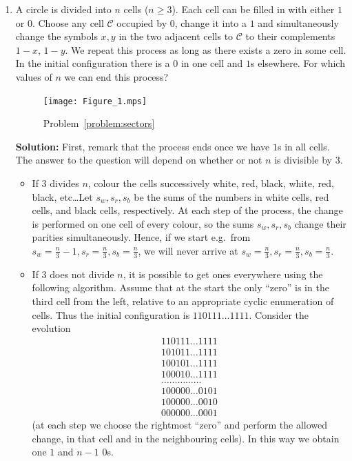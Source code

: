 \documentclass{article}
\newcommand{\solution}[1]{%
\ifsolutions%
    \textbf{Solution: } #1
\fi
}
\begin{document}
\begin{enumerate}
\item\label{problem:sectors} A circle is divided into $n$ cells ($n \geq 3$). Each cell can be filled in with either $1$ or $0$. Choose any cell $\mathcal{C}$ occupied by $0$, change it into a $1$ and simultaneously change the symbols $x, y$ in the two adjacent cells to $\mathcal{C}$ to their complements $1 - x$, $1 - y$. We repeat this process as long as there exists a zero in some cell. In the initial configuration there is a $0$ in one cell and $1$s elsewhere. For which values of $n$ we can end this process?

\begin{figure}[!ht]
\centering
\texttt{[image: Figure\_1.mps]}
\caption{Problem~\ref{problem:sectors}}
\end{figure}


\solution{%
First, remark that the process ends once we have $1$s in all cells. The answer to the question will depend on whether or not $n$ is divisible by $3$.

\begin{itemize}

\item If $3$ divides $n$, colour the cells successively white, red, black, white, red, black, etc\ldots Let $s_w, s_r, s_b$ be the sums of the numbers in white cells, red cells, and black cells, respectively. At each step of the process, the change is performed on one cell of every colour, so the sums $s_w, s_r, s_b$ change their parities simultaneously. Hence, if we start e.g.\ from $s_w = \frac{n}{3} - 1, s_r = \frac{n}{3}, s_b = \frac{n}{3}$, we will never arrive at $s_w = \frac{n}{3}, s_r = \frac{n}{3}, s_b = \frac{n}{3}$.

\item If $3$ does not divide $n$, it is possible to get ones everywhere using the following algorithm. Assume that at the start the only ``zero'' is in the third cell from the left, relative to an appropriate cyclic enumeration of cells. Thus the initial configuration is $110111 \dots 1111$. Consider the evolution
\begin{align*}
    110111 \dots 1111 \\
    101011 \dots 1111 \\
    100101 \dots 1111 \\
    100010 \dots 1111 \\
    \dots \dots \dots \dots \dots \\
    100000 \dots 0101 \\
    100000 \dots 0010 \\
    000000 \dots 0001
\end{align*}
(at each step we choose the rightmost ``zero'' and perform the allowed change, in that cell and in the neighbouring cells). In this way we obtain one $1$ and $n-1$ $0$s.


\end{itemize}}
\end{enumerate}
\end{document}
